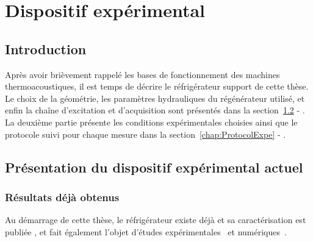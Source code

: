 \chapter{Dispositif expérimental}
\mylocaltoc

%    

\newpage

%

\section{Introduction}\label{chap:IntroProtocExp}
Après avoir brièvement rappelé les bases de fonctionnement des machines thermoacoustiques, il est temps de décrire le réfrigérateur support de cette thèse. Le choix de la géométrie, les paramètres hydrauliques du régénérateur utilisé, et enfin la chaîne d'excitation et d'acquisition sont présentés dans la section~\ref{chap:PresentationTacot} - . La deuxième partie présente les conditions expérimentales choisies ainsi que le protocole suivi pour chaque mesure dans la section~\ref{chap:ProtocolExpe} - .


\section{Présentation du dispositif expérimental actuel}\label{chap:PresentationTacot}

\subsection{Résultats déjà obtenus}\label{chap:PresTacot_ResultatsATE}
 Au démarrage de cette thèse, le réfrigérateur existe déjà et sa caractérisation est publiée \cite{ramadan_design_2021}, et fait également l'objet d'études expérimentales~\cite{ramadan_experimental_2018, ramadan_experimental_2021} et  numériques~\cite{hireche_numerical_2019, hireche_experimental_2020, baltean_gravity_2025}. 

